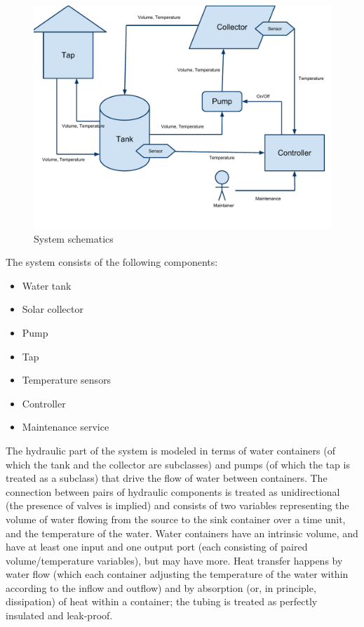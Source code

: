 \documentclass[a4paper,12pt]{article}
\begin{document}
\begin{figure}
\centering
\includegraphics[scale=0.8]{schema.pdf}
\caption{System schematics}
\end{figure} 


The system consists of the following components:

\begin{itemize}

\item Water tank

\item Solar collector

\item Pump

\item Tap

\item Temperature sensors

\item Controller

\item Maintenance service

\end{itemize}

The hydraulic part of the system is modeled in terms of water containers (of which the tank and the collector are subclasses) and pumps (of which the tap is treated as a subclass) that drive the flow of water between containers. The connection between pairs of hydraulic components is treated as unidirectional (the presence of valves is implied) and consists of two variables representing the volume of water flowing from the source to the sink container over a time unit, and the temperature of the water. Water containers have an intrinsic volume, and have at least one input and one output port (each consisting of paired volume/temperature variables), but may have more. Heat transfer happens by water flow (which each container adjusting the temperature of the water within according to the inflow and outflow) and by absorption (or, in principle, dissipation) of heat within a container; the tubing is treated as perfectly insulated and leak-proof.
\end{document}
